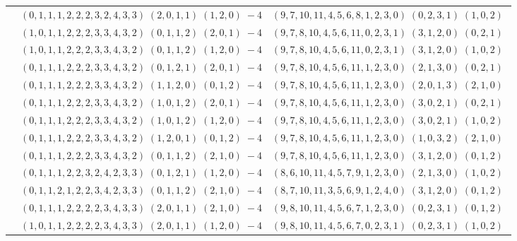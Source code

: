 \documentclass[11pt]{article}
\begin{document}
\begin{longtable}[l]{|c|c|c|}
 \cline{2-3} 
 & $(0 ,1 ,1 ,1 ,2 ,2 ,2 ,3 ,2 ,4 ,3 ,3) \;(2 ,0 ,1 ,1) \;(1 ,2 ,0) \;-4$ & $(9 ,7 ,10 ,11 ,4 ,5 ,6 ,8 ,1 ,2 ,3 ,0) \;(0 ,2 ,3 ,1) \;(1 ,0 ,2) \;$\\ 
 \cline{2-3} 
 & $(1 ,0 ,1 ,1 ,2 ,2 ,2 ,3 ,3 ,4 ,3 ,2) \;(0 ,1 ,1 ,2) \;(2 ,0 ,1) \;-4$ & $(9 ,7 ,8 ,10 ,4 ,5 ,6 ,11 ,0 ,2 ,3 ,1) \;(3 ,1 ,2 ,0) \;(0 ,2 ,1) \;$\\ 
 \cline{2-3} 
 & $(1 ,0 ,1 ,1 ,2 ,2 ,2 ,3 ,3 ,4 ,3 ,2) \;(0 ,1 ,1 ,2) \;(1 ,2 ,0) \;-4$ & $(9 ,7 ,8 ,10 ,4 ,5 ,6 ,11 ,0 ,2 ,3 ,1) \;(3 ,1 ,2 ,0) \;(1 ,0 ,2) \;$\\ 
 \cline{2-3} 
 & $(0 ,1 ,1 ,1 ,2 ,2 ,2 ,3 ,3 ,4 ,3 ,2) \;(0 ,1 ,2 ,1) \;(2 ,0 ,1) \;-4$ & $(9 ,7 ,8 ,10 ,4 ,5 ,6 ,11 ,1 ,2 ,3 ,0) \;(2 ,1 ,3 ,0) \;(0 ,2 ,1) \;$\\ 
 \cline{2-3} 
 & $(0 ,1 ,1 ,1 ,2 ,2 ,2 ,3 ,3 ,4 ,3 ,2) \;(1 ,1 ,2 ,0) \;(0 ,1 ,2) \;-4$ & $(9 ,7 ,8 ,10 ,4 ,5 ,6 ,11 ,1 ,2 ,3 ,0) \;(2 ,0 ,1 ,3) \;(2 ,1 ,0) \;$\\ 
 \cline{2-3} 
 & $(0 ,1 ,1 ,1 ,2 ,2 ,2 ,3 ,3 ,4 ,3 ,2) \;(1 ,0 ,1 ,2) \;(2 ,0 ,1) \;-4$ & $(9 ,7 ,8 ,10 ,4 ,5 ,6 ,11 ,1 ,2 ,3 ,0) \;(3 ,0 ,2 ,1) \;(0 ,2 ,1) \;$\\ 
 \cline{2-3} 
 & $(0 ,1 ,1 ,1 ,2 ,2 ,2 ,3 ,3 ,4 ,3 ,2) \;(1 ,0 ,1 ,2) \;(1 ,2 ,0) \;-4$ & $(9 ,7 ,8 ,10 ,4 ,5 ,6 ,11 ,1 ,2 ,3 ,0) \;(3 ,0 ,2 ,1) \;(1 ,0 ,2) \;$\\ 
 \cline{2-3} 
 & $(0 ,1 ,1 ,1 ,2 ,2 ,2 ,3 ,3 ,4 ,3 ,2) \;(1 ,2 ,0 ,1) \;(0 ,1 ,2) \;-4$ & $(9 ,7 ,8 ,10 ,4 ,5 ,6 ,11 ,1 ,2 ,3 ,0) \;(1 ,0 ,3 ,2) \;(2 ,1 ,0) \;$\\ 
 \cline{2-3} 
 & $(0 ,1 ,1 ,1 ,2 ,2 ,2 ,3 ,3 ,4 ,3 ,2) \;(0 ,1 ,1 ,2) \;(2 ,1 ,0) \;-4$ & $(9 ,7 ,8 ,10 ,4 ,5 ,6 ,11 ,1 ,2 ,3 ,0) \;(3 ,1 ,2 ,0) \;(0 ,1 ,2) \;$\\ 
 \cline{2-3} 
 & $(0 ,1 ,1 ,1 ,2 ,2 ,3 ,2 ,4 ,2 ,3 ,3) \;(0 ,1 ,2 ,1) \;(1 ,2 ,0) \;-4$ & $(8 ,6 ,10 ,11 ,4 ,5 ,7 ,9 ,1 ,2 ,3 ,0) \;(2 ,1 ,3 ,0) \;(1 ,0 ,2) \;$\\ 
 \cline{2-3} 
 & $(0 ,1 ,1 ,2 ,1 ,2 ,2 ,3 ,4 ,2 ,3 ,3) \;(0 ,1 ,1 ,2) \;(2 ,1 ,0) \;-4$ & $(8 ,7 ,10 ,11 ,3 ,5 ,6 ,9 ,1 ,2 ,4 ,0) \;(3 ,1 ,2 ,0) \;(0 ,1 ,2) \;$\\ 
 \cline{2-3} 
 & $(0 ,1 ,1 ,1 ,2 ,2 ,2 ,2 ,3 ,4 ,3 ,3) \;(2 ,0 ,1 ,1) \;(2 ,1 ,0) \;-4$ & $(9 ,8 ,10 ,11 ,4 ,5 ,6 ,7 ,1 ,2 ,3 ,0) \;(0 ,2 ,3 ,1) \;(0 ,1 ,2) \;$\\ 
 \cline{2-3} 
 & $(1 ,0 ,1 ,1 ,2 ,2 ,2 ,2 ,3 ,4 ,3 ,3) \;(2 ,0 ,1 ,1) \;(1 ,2 ,0) \;-4$ & $(9 ,8 ,10 ,11 ,4 ,5 ,6 ,7 ,0 ,2 ,3 ,1) \;(0 ,2 ,3 ,1) \;(1 ,0 ,2) \;$\\ 

\end{longtable}
\end{document}
